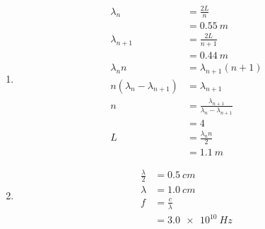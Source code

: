 \documentclass{article}
\begin{document}
\begin{enumerate}
  \item

        \begin{align*}
          \lambda_n                       & = \frac{2 L}{n}                                       \\
                                          & = \qty{0.55}{m}                                       \\
          \lambda_{n + 1}                 & = \frac{2 L}{n + 1}                                   \\
                                          & = \qty{0.44}{m}                                       \\
          \lambda_n n                     & = \lambda_{n + 1} (n + 1)                             \\
          n (\lambda_n - \lambda_{n + 1}) & = \lambda_{n + 1}                                     \\
          n                               & = \frac{\lambda_{n + 1}}{\lambda_n - \lambda_{n + 1}} \\
                                          & = 4                                                   \\
          L                               & = \frac{\lambda_n n}{2}                               \\
                                          & = \qty{1.1}{m}
        \end{align*}

  \item

        \begin{align*}
          \frac{\lambda}{2} & = \qty{0.5}{cm}     \\
          \lambda           & = \qty{1.0}{cm}     \\
          f                 & = \frac{c}{\lambda} \\
                            & = \qty{3.0e10}{Hz}
        \end{align*}
\end{enumerate}

\subsection{}
\end{document}
